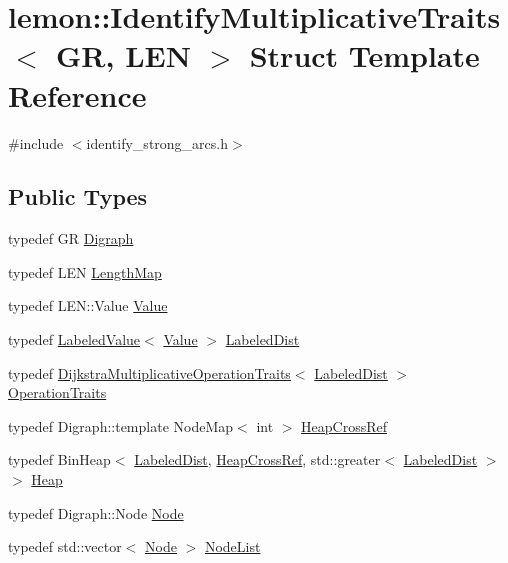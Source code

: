 \hypertarget{structlemon_1_1_identify_multiplicative_traits}{}\section{lemon\+:\+:Identify\+Multiplicative\+Traits$<$ GR, L\+EN $>$ Struct Template Reference}
\label{structlemon_1_1_identify_multiplicative_traits}


{\ttfamily \#include $<$identify\+\_\+strong\+\_\+arcs.\+h$>$}

\subsection*{Public Types}
\begin{DoxyCompactItemize}
\item 
typedef GR \hyperlink{structlemon_1_1_identify_multiplicative_traits_a586c2b69092471f155318915c7e5bdd0}{Digraph}
\item 
typedef L\+EN \hyperlink{structlemon_1_1_identify_multiplicative_traits_a134355b88655b1c297264296d2c70d3a}{Length\+Map}
\item 
typedef L\+E\+N\+::\+Value \hyperlink{structlemon_1_1_identify_multiplicative_traits_ae44c59a817f36ac3d7c024fc75d5ae50}{Value}
\item 
typedef \hyperlink{classlemon_1_1_labeled_value}{Labeled\+Value}$<$ \hyperlink{structlemon_1_1_identify_multiplicative_traits_ae44c59a817f36ac3d7c024fc75d5ae50}{Value} $>$ \hyperlink{structlemon_1_1_identify_multiplicative_traits_a91b3da314fe157ce5c2674e3608d4cde}{Labeled\+Dist}
\item 
typedef \hyperlink{structlemon_1_1_dijkstra_multiplicative_operation_traits}{Dijkstra\+Multiplicative\+Operation\+Traits}$<$ \hyperlink{structlemon_1_1_identify_multiplicative_traits_a91b3da314fe157ce5c2674e3608d4cde}{Labeled\+Dist} $>$ \hyperlink{structlemon_1_1_identify_multiplicative_traits_ac66ce4af1205a7cd0564ad8d1ecf7a4a}{Operation\+Traits}
\item 
typedef Digraph\+::template Node\+Map$<$ int $>$ \hyperlink{structlemon_1_1_identify_multiplicative_traits_ae84c68f24215f7f666f26ca3125a284d}{Heap\+Cross\+Ref}
\item 
typedef Bin\+Heap$<$ \hyperlink{structlemon_1_1_identify_multiplicative_traits_a91b3da314fe157ce5c2674e3608d4cde}{Labeled\+Dist}, \hyperlink{structlemon_1_1_identify_multiplicative_traits_ae84c68f24215f7f666f26ca3125a284d}{Heap\+Cross\+Ref}, std\+::greater$<$ \hyperlink{structlemon_1_1_identify_multiplicative_traits_a91b3da314fe157ce5c2674e3608d4cde}{Labeled\+Dist} $>$ $>$ \hyperlink{structlemon_1_1_identify_multiplicative_traits_aa42c8b081b4e4783190eabd4ac03154f}{Heap}
\item 
typedef Digraph\+::\+Node \hyperlink{structlemon_1_1_identify_multiplicative_traits_a391c4d6be09a511224b23628fbc9c223}{Node}
\item 
typedef std\+::vector$<$ \hyperlink{structlemon_1_1_identify_multiplicative_traits_a391c4d6be09a511224b23628fbc9c223}{Node} $>$ \hyperlink{structlemon_1_1_identify_multiplicative_traits_a686335471dfcb3c0b7baef1764679a66}{Node\+List}
\end{DoxyCompactItemize}
